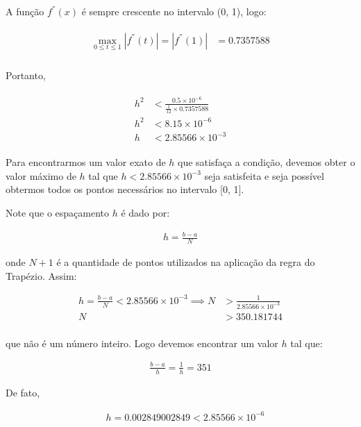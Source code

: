 \documentclass[paper=a4, fontsize=12pt]{scrartcl}
\numberwithin{equation}{section} %
\numberwithin{figure}{section} %
\numberwithin{table}{section} %
\begin{document}
		A função $ f^{''}(x) $ é sempre crescente no intervalo (0, 1), logo:

		\begin{align*}
			\begin{split}
				\max_{0 \leq t \leq 1} |f^{''}(t)| = |f^{''} (1)| &= 0.7357588\\
			\end{split}
		\end{align*}

		Portanto,

		\begin{align*}
			\begin{split}
				h^2  	&< \frac{0.5 \times 10^{-6}}{\frac{1}{12} \times 0.7357588} \\
				h^2 	&< 8.15 \times 10^{-6} \\
				h 		&< 2.85566 \times 10^{-3}
			\end{split}
		\end{align*}

		Para encontrarmos um valor exato de $h$ que satisfaça a condição, devemos obter o valor máximo de $h$ tal que $ h < 2.85566 \times 10^{-3} $ seja satisfeita e seja possível obtermos todos os pontos necessários no intervalo [0, 1].

		Note que o espaçamento $h$ é dado por:

		\begin{align*}
			h = \frac{b - a}{N}
		\end{align*}

		onde $N + 1$ é a quantidade de pontos utilizados na aplicação da regra do Trapézio. Assim:

		\begin{align*}
		h = \frac{b - a}{N} < 2.85566 \times 10^{-3}\implies N &> \frac{1}{2.85566 \times 10^{-3}} \\
		 N &> 350.181744  \\
		\end{align*}

		que não é um número inteiro. Logo devemos encontrar um valor $h$ tal que:

		\begin{align*}
		\frac{b - a}{h} = \frac{1}{h} = 351
		\end{align*}

		De fato,

		\begin{align*}
			\quad  h = 0.002849002849 < 2.85566 \times 10^{-6}
		\end{align*}
\end{document}
